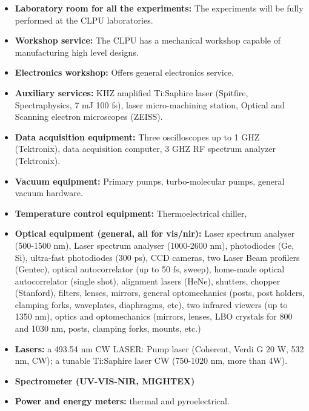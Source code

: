 \begin{itemize}
    \item \textbf{Laboratory room for all the experiments:} The experiments will be fully performed at the CLPU laboratories.
    
\item \textbf{Workshop service:} The CLPU has a mechanical workshop capable of manufacturing high level designs. 

\item \textbf{Electronics workshop:} Offers general electronics service. 

\item \textbf{Auxiliary services:} KHZ amplified Ti:Saphire laser (Spitfire, Spectraphysics, 7 mJ 100 fs), laser micro-machining station, Optical and Scanning electron microscopes (ZEISS).  

\item \textbf{Data acquisition equipment:} Three oscilloscopes up to 1 GHZ (Tektronix), data acquisition computer, 3 GHZ RF spectrum analyzer (Tektronix). 

\item \textbf{Vacuum equipment:} Primary pumps, turbo-molecular pumps, general vacuum hardware.

\item \textbf{Temperature control equipment:} Thermoelectrical chiller, 

\item \textbf{Optical equipment (general, all for vis/nir):} Laser spectrum analyser (500-1500 nm), Laser spectrum analyser (1000-2600 nm), photodiodes (Ge, Si), ultra-fast photodiodes (300 ps), CCD cameras, two Laser Beam profilers (Gentec), optical autocorrelator (up to 50 fs, sweep), home-made optical autocorrelator (single shot), alignment lasers (HeNe), shutters, chopper (Stanford), filters, lenses, mirrors, general optomechanics (posts, post holders, clamping forks, waveplates, diaphragms, etc), two infrared viewers (up to 1350 nm), optics and optomechanics (mirrors, lenses, LBO crystals for 800 and 1030 nm, posts, clamping forks, mounts, etc.)

\item \textbf{Lasers:} a 493.54 nm CW LASER: Pump laser (Coherent, Verdi G 20 W, 532 nm, CW); a tunable Ti:Saphire laser CW (750-1020 nm,  more than 4W).

\item \textbf{Spectrometer (UV-VIS-NIR, MIGHTEX)}

\item \textbf{Power and energy meters:} thermal and pyroelectrical. 

\end{itemize}

